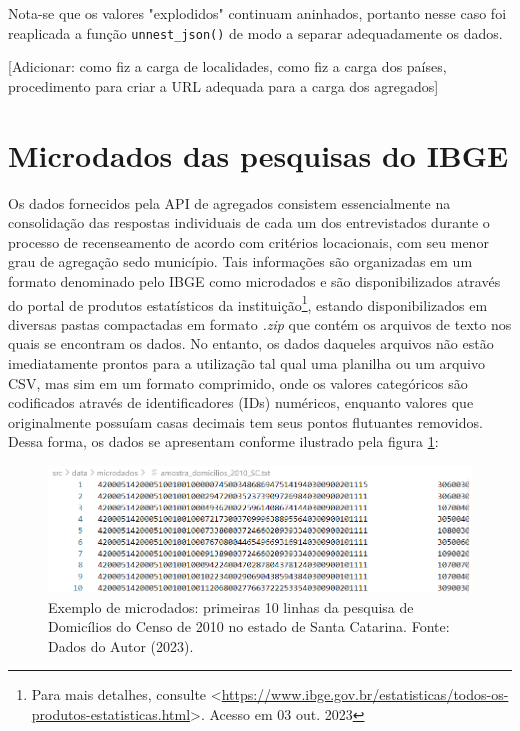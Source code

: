     Nota-se que os valores "explodidos" continuam aninhados, portanto nesse caso foi reaplicada a função \lstinline{unnest_json()} de modo a separar adequadamente os dados.

    [Adicionar: como fiz a carga de localidades, como fiz a carga dos países, procedimento para criar a URL adequada para a carga dos agregados]



\section{Microdados das pesquisas do IBGE}

    Os dados fornecidos pela API de agregados consistem essencialmente na consolidação das respostas individuais de cada um dos entrevistados durante o processo de recenseamento de acordo com critérios locacionais, com seu menor grau de agregação sedo município. Tais informações são organizadas em um formato denominado pelo IBGE como microdados e são disponibilizados através do portal de produtos estatísticos da instituição\footnote{Para mais detalhes, consulte <\url{https://www.ibge.gov.br/estatisticas/todos-os-produtos-estatisticas.html}>. Acesso em 03 out. 2023}, estando disponibilizados em diversas pastas compactadas em formato \textit{.zip} que contém os arquivos de texto nos quais se encontram os dados. No entanto, os dados daqueles arquivos não estão imediatamente prontos para a utilização tal qual uma planilha ou um arquivo CSV, mas sim em um formato comprimido, onde os valores categóricos são codificados através de identificadores (IDs) numéricos, enquanto valores que originalmente possuíam casas decimais tem seus pontos flutuantes removidos. Dessa forma, os dados se apresentam conforme ilustrado pela figura \ref{fig:exemplo-microdado}:

\begin{figure}[h]
    \centering
    \includegraphics[width=\textwidth]{files/img/exemplo_microdado.png}
    \caption{Exemplo de microdados: primeiras 10 linhas da pesquisa de Domicílios do Censo de 2010 no estado de Santa Catarina. Fonte: Dados do Autor (2023).}
    \label{fig:exemplo-microdado}
\end{figure}


